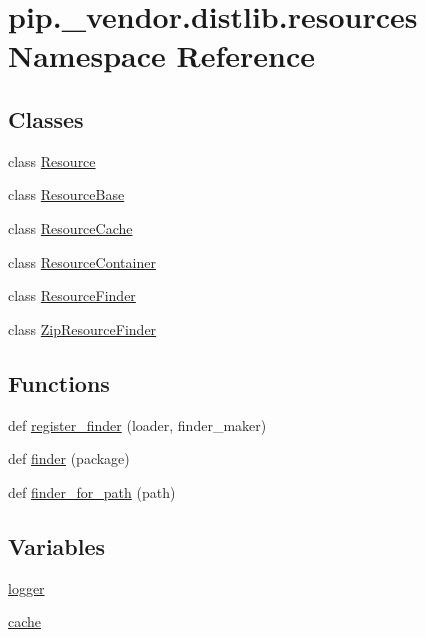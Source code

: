 \hypertarget{namespacepip_1_1__vendor_1_1distlib_1_1resources}{}\section{pip.\+\_\+vendor.\+distlib.\+resources Namespace Reference}
\label{namespacepip_1_1__vendor_1_1distlib_1_1resources}
\subsection*{Classes}
\begin{DoxyCompactItemize}
\item 
class \hyperlink{classpip_1_1__vendor_1_1distlib_1_1resources_1_1Resource}{Resource}
\item 
class \hyperlink{classpip_1_1__vendor_1_1distlib_1_1resources_1_1ResourceBase}{Resource\+Base}
\item 
class \hyperlink{classpip_1_1__vendor_1_1distlib_1_1resources_1_1ResourceCache}{Resource\+Cache}
\item 
class \hyperlink{classpip_1_1__vendor_1_1distlib_1_1resources_1_1ResourceContainer}{Resource\+Container}
\item 
class \hyperlink{classpip_1_1__vendor_1_1distlib_1_1resources_1_1ResourceFinder}{Resource\+Finder}
\item 
class \hyperlink{classpip_1_1__vendor_1_1distlib_1_1resources_1_1ZipResourceFinder}{Zip\+Resource\+Finder}
\end{DoxyCompactItemize}
\subsection*{Functions}
\begin{DoxyCompactItemize}
\item 
def \hyperlink{namespacepip_1_1__vendor_1_1distlib_1_1resources_a91eed5c35d5a82aed3f476c5f961e29b}{register\+\_\+finder} (loader, finder\+\_\+maker)
\item 
def \hyperlink{namespacepip_1_1__vendor_1_1distlib_1_1resources_a19cb1b460cca0d3a5c6bea20e4ebc4b3}{finder} (package)
\item 
def \hyperlink{namespacepip_1_1__vendor_1_1distlib_1_1resources_a020f51bd6afc1577349f5123f95eda2c}{finder\+\_\+for\+\_\+path} (path)
\end{DoxyCompactItemize}
\subsection*{Variables}
\begin{DoxyCompactItemize}
\item 
\hyperlink{namespacepip_1_1__vendor_1_1distlib_1_1resources_ac36f246ab1eb832bd94d2abec81b16fa}{logger}
\item 
\hyperlink{namespacepip_1_1__vendor_1_1distlib_1_1resources_aeb94043edaac6fca77ea7eb5370671f2}{cache}
\end{DoxyCompactItemize}


